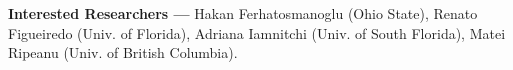 \item \textbf{Interested Researchers ---} Hakan Ferhatosmanoglu (Ohio State), Renato Figueiredo (Univ. of Florida), Adriana Iamnitchi (Univ. of South Florida), Matei Ripeanu (Univ. of British Columbia).
